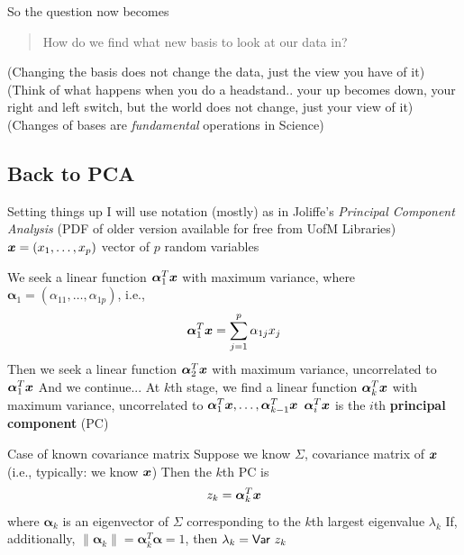 \documentclass[aspectratio=169]{beamer}\usepackage[]{graphicx}\usepackage[]{xcolor}
\begin{document}
\begin{frame}
So the question now becomes
\begin{quote}
How do we find what new basis to look at our data in?
\end{quote}
\vfill
(Changing the basis does not change the data, just the view you have of it)
\vfill
(Think of what happens when you do a headstand.. your up becomes down, your right and left switch, but the world does not change, just your view of it)
\vfill
(Changes of bases are \emph{fundamental} operations in Science)
\end{frame}



\subsection{Back to PCA}
\begin{frame}{Setting things up}
I will use notation (mostly) as in Joliffe's \emph{Principal Component Analysis} (PDF of older version available for free from UofM Libraries)
\vfill
$\bm{x}=(x_1,\ldots,x_p)$ vector of $p$ random variables
\end{frame}


\begin{frame} 
We seek a linear function $\bm{\alpha}_1^T\bm{x}$ with maximum variance, where $\bm{\alpha}_1=(\alpha_{11},\ldots,\alpha_{1p})$, i.e.,
\[
\bm{\alpha}_1^T\bm{x} = \sum_{j=1}^p\alpha_{1j}x_j
\]
\vfill
Then we seek a linear function $\bm{\alpha}_2^T\bm{x}$ with maximum variance, uncorrelated to $\bm{\alpha}_1^T\bm{x}$
\vfill
And we continue...
\vfill
At $k$th stage, we find a linear function $\bm{\alpha}_k^T\bm{x}$ with maximum variance, uncorrelated to $\bm{\alpha}_1^T\bm{x},\ldots,\bm{\alpha}_{k-1}^T\bm{x}$
\vfill
$\bm{\alpha}_i^T\bm{x}$ is the $i$th \textbf{principal component} (PC)
\end{frame}

\begin{frame}{Case of known covariance matrix}
Suppose we know $\Sigma$, covariance matrix of $\bm{x}$ (i.e., typically: we know $\bm{x}$)
\vfill
Then the $k$th PC is 
\[
z_k=\bm{\alpha}_k^T\bm{x}
\]
where $\bm{\alpha}_k$ is an eigenvector of $\Sigma$ corresponding to the $k$th largest eigenvalue $\lambda_k$
\vfill
If, additionally, $\|\bm{\alpha}_k\|=\bm{\alpha}_k^T\bm{\alpha}=1$, then $\lambda_k=\mathsf{Var}\  z_k$
\end{frame}
\end{document}
